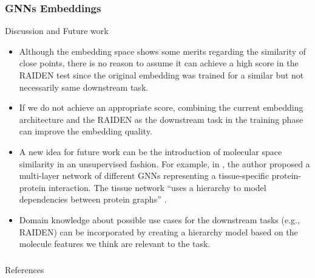 \documentclass[usenames,dvipsnames]{beamer}
\begin{document}
\begin{frame}
	\frametitle{GNNs Embeddings}
	\begin{block}{Discussion and Future work}
		\begin{itemize}
			\item Although the embedding space shows some merits regarding the similarity of close points, there is no reason to assume it can achieve a high score in the RAIDEN test since the original embedding was trained for a similar but not necessarily same downstream task.
			
			\item If we do not achieve an appropriate score, combining the current embedding architecture and the RAIDEN as the downstream task in the training phase can improve the embedding quality.
			
			\item A new idea for future work can be the introduction of molecular space similarity in an unsupervised fashion. For example, in \cite{zitnik_2017}, the author proposed a multi-layer network of different GNNs representing a tissue-specific protein-protein interaction. The tissue network ``uses a hierarchy to model dependencies between protein graphs'' \cite{zitnik_2017}.
						
			\item Domain knowledge about possible use cases for the downstream tasks (e.g., RAIDEN) can be incorporated by creating a hierarchy model based on the molecule features we think are relevant to the task.
		\end{itemize}
	\end{block}	
\end{frame}

\begin{frame}
	\frametitle{}
		\begin{block}{References}   
			
			{}      
       \end{block}

      
\end{frame}
\end{document}
